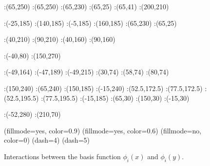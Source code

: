 {\begin{figure}
:(65,250) :(65,250)
:(65,230) :(65,25)
:(65,41) :(200,210)

:(-25,185) :(140,185)
:(-5,185) :(160,185)
:(65,230) :(65,25)

%

:(40,210) :(90,210)
:(40,160) :(90,160)

:(-40,80) :(150,270)

:(-49,164) :(-47,189) :(-49,215) 
:(30,74) :(58,74) :(80,74) 

:(150,240) :(65,240) :(150,185) 
:(-15,240) :(52.5,172.5) :(77.5,172.5) 
:(52.5,195.5) :(77.5,195.5) :(-15,185) 
:(65,30) :(150,30) :(-15,30) 

:(-52,280) :(210,70)


\figdrawbegin{}

\figset(fillmode=yes, color=0.9)
\figdrawline[29,30,10,6,29]
\figdrawline[30,32,12,16,30]
\figdrawline[32,31,5,9,32]
\figdrawline[31,11,15,29,31]
\figset(fillmode=yes, color=0.6)
\figdrawline[29,30,32,31,29]
\figset(fillmode=no, color=0)
\figdrawarrow[1,2]
\figdrawarrow[3,4]
\figdrawline[5,6]
\figdrawline[9,10]
\figdrawline[11,12]
\figdrawline[15,16]
\figset(dash=4)
\figdrawline[7,56]
\figdrawline[57,55]
\figdrawline[53,8]
\figdrawline[13,59]
\figdrawline[60,61]
\figdrawline[62,14]
\figset(dash=5)
\figdrawline[33,34]
\figdrawend

\centerline{\box\figBoxA}
\caption{Interactions between the basis function $\phi_i(x)$ and $\phi_i(y)$.}\label{dia}
\end{figure}

}
